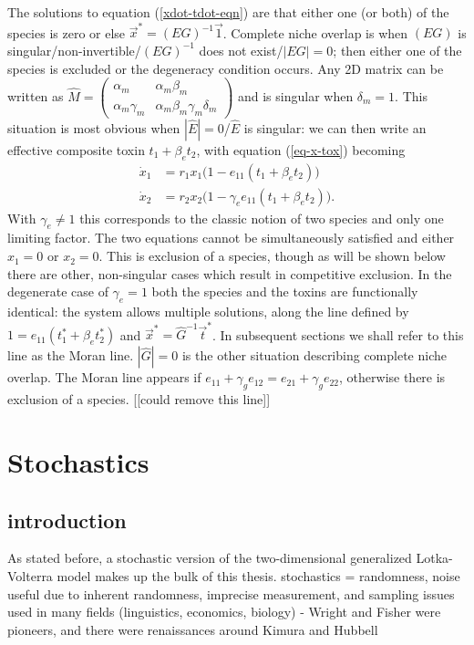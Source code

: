 \documentclass[a4paper,11pt]{article}
\numberwithin{equation}{section} %
\begin{document}
The solutions to equation (\ref{xdot-tdot-eqn}) are that either one (or both) of the species is zero or else $\vec{x}^* = (E G)^{-1}\vec{1}$. 
Complete niche overlap is when $(E G)$ is singular/non-invertible/$(E G)^{-1}$ does not exist/$|E G|=0$; then either one of the species is excluded or the degeneracy condition occurs. 
Any 2D matrix can be written as $\hat{M}=\begin{pmatrix}
\alpha_m   & \alpha_m\beta_m \\
\alpha_m\gamma_m & \alpha_m\beta_m\gamma_m\delta_m
\end{pmatrix}$ and is singular when $\delta_m=1$. 
This situation is most obvious when $|\hat{E}|=0$/$\hat{E}$ is singular: we can then write an effective composite toxin $t_1 + \beta_e t_2$, with equation (\ref{eq-x-tox}) becoming
\begin{align*}
\dot{x}_1 &= r_1 x_1\big(1 -          e_{11}\left( t_1 + \beta_e t_2 \right) \big) \\
\dot{x}_2 &= r_2 x_2\big(1 - \gamma_e e_{11}\left( t_1 + \beta_e t_2 \right) \big).
\end{align*}
With $\gamma_e\neq 1$ this corresponds to the classic notion of two species and only one limiting factor. The two equations cannot be simultaneously satisfied and either $x_1=0$ or $x_2=0$. This is exclusion of a species, though as will be shown below there are other, non-singular cases which result in competitive exclusion. 
In the degenerate case of $\gamma_e=1$ both the species and the toxins are functionally identical: the system allows multiple solutions, along the line defined by $1=e_{11}\left( t_1^* + \beta_e t_2^* \right)$ and $\vec{x}^*=\hat{G}^{-1}\vec{t}^*$. 
In subsequent sections we shall refer to this line as the Moran line. 
$|\hat{G}|=0$ is the other situation describing complete niche overlap. The Moran line appears if $e_{11}+\gamma_ge_{12}=e_{21}+\gamma_ge_{22}$, otherwise there is exclusion of a species. [[could remove this line]]








\section{Stochastics}
\subsection{introduction}
As stated before, a stochastic version of the two-dimensional generalized Lotka-Volterra model makes up the bulk of this thesis. 
stochastics = randomness, noise
useful due to inherent randomness, imprecise measurement, and sampling issues
used in many fields (linguistics, economics, biology) - Wright and Fisher were pioneers, and there were renaissances around Kimura and Hubbell
\end{document}
